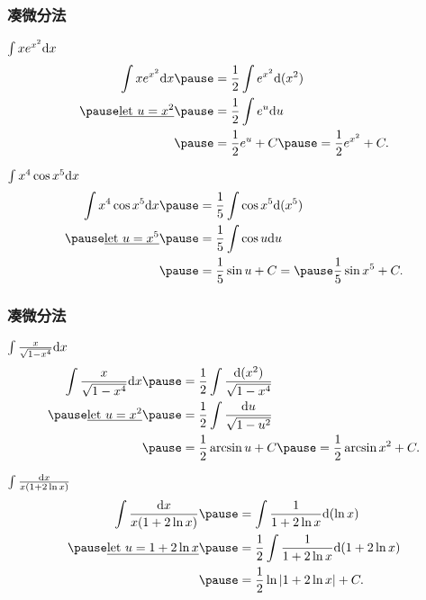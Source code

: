\documentclass[
10pt,
aspectratio=43,
]{beamer}
\begin{document}
\begin{frame}
	\frametitle{凑微分法}
	\everymath{\displaystyle}
	{\small
		\begin{exampleblock}{$\color{black}\int x e^{x^2} \mathrm{d}x$}
			$$
				\begin{aligned}
					\int x e^{x^2} \mathrm{d}x         & \pause= \frac{1}{2} \int e^{x^2} \mathrm{d}(x^2)         \\
					\pause\underline{\text{let }u=x^2} & \pause=  \frac{1}{2} \int e^u \mathrm{d}u                \\
					                                   & \pause= \frac{1}{2} e^u+C \pause= \frac{1}{2} e^{x^2}+C.
				\end{aligned}
			$$
		\end{exampleblock}
		\pause
		\begin{exampleblock}{$\color{black}\int x^4 \cos x^5 \mathrm{d}x$}
			$$
				\begin{aligned}
					\int x^4 \cos x^5 \mathrm{d}x      & \pause = \frac{1}{5} \int \cos x^5 \mathrm{d}(x^5)            \\
					\pause\underline{\text{let }u=x^5} & \pause =  \frac{1}{5} \int \cos u \mathrm{d}u                 \\
					                                   & \pause = \frac{1}{5} \sin u+C =\pause \frac{1}{5} \sin x^5+C.
				\end{aligned}
			$$
		\end{exampleblock}
	}
\end{frame}


\begin{frame}
	\frametitle{凑微分法}
	\everymath{\displaystyle}
	{\small
		\begin{exampleblock}{$\color{black}\int \frac{x}{\sqrt{1-x^4}} \mathrm{d}x$}
			$$
				\begin{aligned}
					\int \frac{x}{\sqrt{1-x^4}} \mathrm{d}x & \pause= \frac{1}{2} \int \frac{\mathrm{d}(x^2)}{\sqrt{1-x^4}}      \\
					\pause\underline{\text{let }u=x^2}      & \pause=  \frac{1}{2} \int \frac{\mathrm{d}u}{\sqrt{1-u^2}}         \\
					                                        & \pause= \frac{1}{2} \arcsin u+C \pause= \frac{1}{2} \arcsin x^2+C.
				\end{aligned}
			$$
		\end{exampleblock}
		\pause
		\begin{exampleblock}{$\color{black}\int \frac{\mathrm{d}x}{x(1+2 \ln x)}$}
			$$
				\begin{aligned}
					\int \frac{\mathrm{d}x}{x(1+2 \ln x)}    & \pause= \int \frac{1}{1+2 \ln x} \mathrm{d}(\ln x)                  \\
					\pause\underline{\text{let }u=1+2 \ln x} & \pause=  \frac{1}{2} \int \frac{1}{1+2 \ln x} \mathrm{d}(1+2 \ln x) \\
					                                         & \pause= \frac{1}{2} \ln |1+2 \ln x|+C.
				\end{aligned}
			$$
		\end{exampleblock}
	}
\end{frame}
\end{document}

